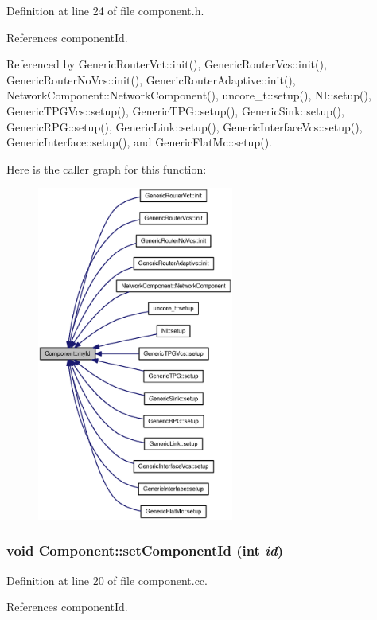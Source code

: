 Definition at line 24 of file component.h.

References componentId.

Referenced by GenericRouterVct::init(), GenericRouterVcs::init(), GenericRouterNoVcs::init(), GenericRouterAdaptive::init(), NetworkComponent::NetworkComponent(), uncore\_\-t::setup(), NI::setup(), GenericTPGVcs::setup(), GenericTPG::setup(), GenericSink::setup(), GenericRPG::setup(), GenericLink::setup(), GenericInterfaceVcs::setup(), GenericInterface::setup(), and GenericFlatMc::setup().

Here is the caller graph for this function:\nopagebreak
\begin{figure}[H]
\begin{center}
\leavevmode
\includegraphics[width=183pt]{classComponent_af44955457bc84fa39a346ee70db916f_icgraph}
\end{center}
\end{figure}
\subsubsection[{setComponentId}]{\setlength{\rightskip}{0pt plus 5cm}void Component::setComponentId (int {\em id})}\label{classComponent_4a5ca86f7a92e163287c4aae16f6b4b2}




Definition at line 20 of file component.cc.

References componentId.

